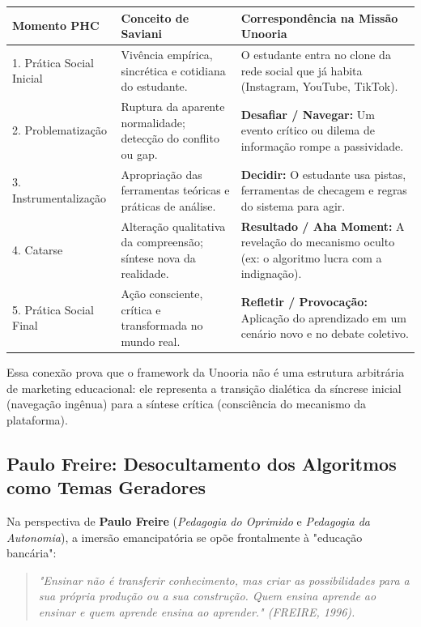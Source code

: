 \documentclass[11pt,a4paper]{article}
\begin{document}
\begin{center}
\small
\begin{tabularx}{\textwidth}{@{}l p{4.8cm} X@{}}
\toprule
\textbf{Momento PHC} & \textbf{Conceito de Saviani} & \textbf{Correspond\^encia na Miss\~ao Unooria} \\
\midrule
1. Pr\'atica Social Inicial & Viv\^encia emp\'irica, sincr\'etica e cotidiana do estudante. & O estudante entra no clone da rede social que j\'a habita (Instagram, YouTube, TikTok). \\
2. Problematiza\c{c}\~ao & Ruptura da aparente normalidade; detec\c{c}\~ao do conflito ou gap. & \textbf{Desafiar / Navegar:} Um evento cr\'itico ou dilema de informa\c{c}\~ao rompe a passividade. \\
3. Instrumentaliza\c{c}\~ao & Apropria\c{c}\~ao das ferramentas te\'oricas e pr\'aticas de an\'alise. & \textbf{Decidir:} O estudante usa pistas, ferramentas de checagem e regras do sistema para agir. \\
4. Catarse & Altera\c{c}\~ao qualitativa da compreens\~ao; s\'intese nova da realidade. & \textbf{Resultado / Aha Moment:} A revela\c{c}\~ao do mecanismo oculto (ex: o algoritmo lucra com a indigna\c{c}\~ao). \\
5. Pr\'atica Social Final & A\c{c}\~ao consciente, cr\'itica e transformada no mundo real. & \textbf{Refletir / Provoca\c{c}\~ao:} Aplica\c{c}\~ao do aprendizado em um cen\'ario novo e no debate coletivo. \\
\bottomrule
\end{tabularx}
\end{center}

Essa conex\~ao prova que o framework da Unooria n\~ao \'e uma estrutura arbitr\'aria de marketing educacional: ele representa a transi\c{c}\~ao dial\'etica da s\'increse inicial (navega\c{c}\~ao ing\^enua) para a s\'intese cr\'itica (consci\^encia do mecanismo da plataforma).

\subsection{Paulo Freire: Desocultamento dos Algoritmos como Temas Geradores}

Na perspectiva de \textbf{Paulo Freire} (\emph{Pedagogia do Oprimido} e \emph{Pedagogia da Autonomia}), a imers\~ao emancipat\'oria se op\~oe frontalmente \`a "educa\c{c}\~ao banc\'aria":

\begin{quote}
\itshape "Ensinar n\~ao \'e transferir conhecimento, mas criar as possibilidades para a sua pr\'opria produ\c{c}\~ao ou a sua constru\c{c}\~ao. Quem ensina aprende ao ensinar e quem aprende ensina ao aprender." (FREIRE, 1996).
\end{quote}
\end{document}
